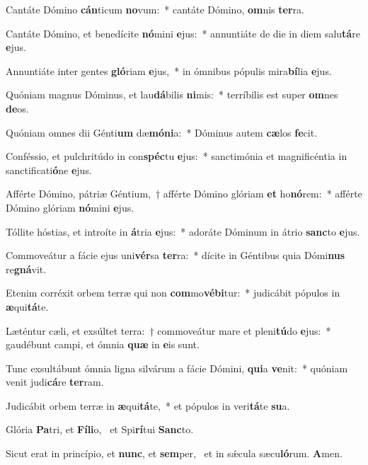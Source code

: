 \item Cantáte Dómino \textbf{cán}ticum \textbf{no}vum:~* cantáte Dómino, \textbf{om}nis \textbf{ter}ra.
\item Cantáte Dómino, et benedícite \textbf{nó}mini \textbf{e}jus:~* annuntiáte de die in diem salu\textbf{tá}re \textbf{e}jus.
\item Annuntiáte inter gentes \textbf{gló}riam \textbf{e}jus,~* in ómnibus pópulis mira\textbf{bí}lia \textbf{e}jus.
\item Quóniam magnus Dóminus, et lau\textbf{dá}bilis \textbf{ni}mis:~* terríbilis est super \textbf{om}nes \textbf{de}os.
\item Quóniam omnes dii Génti\textbf{um} dæ\textbf{mó}\textbf{ni}a:~* Dóminus autem \textbf{cæ}los \textbf{fe}cit.
\item Conféssio, et pulchritúdo in con\textbf{spéc}tu \textbf{e}jus:~* sanctimónia et magnificéntia in sanctificati\textbf{ó}ne \textbf{e}jus.
\item Afférte Dómino, pátriæ Géntium,~† afférte Dómino glóriam \textbf{et} ho\textbf{nó}rem:~* afférte Dómino glóriam \textbf{nó}mini \textbf{e}jus.
\item Tóllite hóstias, et introíte in \textbf{á}tria \textbf{e}jus:~* adoráte Dóminum in átrio \textbf{sanc}to \textbf{e}jus.
\item Commoveátur a fácie ejus uni\textbf{vér}sa \textbf{ter}ra:~* dícite in Géntibus quia Dómi\textbf{nus} re\textbf{gná}vit.
\item Etenim corréxit orbem terræ qui non \textbf{com}mo\textbf{vé}\textbf{bi}tur:~* judicábit pópulos in \textbf{æ}qui\textbf{tá}te.
\item Læténtur cæli, et exsúltet terra:~† commoveátur mare et pleni\textbf{tú}do \textbf{e}jus:~* gaudébunt campi, et ómnia \textbf{quæ} in \textbf{e}is sunt.
\item Tunc exsultábunt ómnia ligna silvárum a fácie Dómini, \textbf{qui}a \textbf{ve}nit:~* quóniam venit judi\textbf{cá}re \textbf{ter}ram.
\item Judicábit orbem terræ in \textbf{æ}qui\textbf{tá}te,~* et pópulos in veri\textbf{tá}te \textbf{su}a.
\item Glória \textbf{Pa}tri, et \textbf{Fí}\textbf{li}o,~\psstar{} et Spi\textbf{rí}tui \textbf{Sanc}to.
\item Sicut erat in princípio, et \textbf{nunc}, et \textbf{sem}per,~\psstar{} et in sǽcula sæcu\textbf{ló}rum. \textbf{A}men.